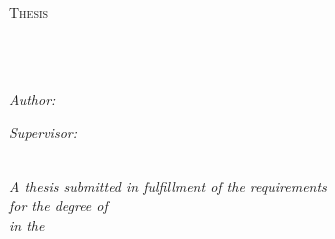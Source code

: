 \documentclass[
10pt, %
twoside, %
chapterinoneline,%
onehalfspacing, %
nolistspacing, %
parskip, %
headsepline, %
english,
]{MastersDoctoralThesis} %
\author{Author} %
\date{\today} %
\begin{document}
\frontmatter %

\pagestyle{plain} %


\begin{titlepage}
	
	\begin{center}
		
		{\scshape\LARGE \univname\par}\vspace{1.5cm} %
		\textsc{\Large Thesis}\\[0.5cm] %
		
		\HRule \\[0.4cm] %
		{\huge \bfseries \ttitle\par}\vspace{0.4cm} %
		\HRule \\[1.5cm] %
		
		\begin{minipage}[htbp]{0.4\textwidth}
			
			\begin{flushleft} \large
				\emph{Author:}\\
				\authorname %
			\end{flushleft}
			
		\end{minipage}
		
		\begin{minipage}[htbp]{0.4\textwidth}
			
			\begin{flushright}\large
				
				\emph{Supervisor:} \\
				\supname %
				 
			\end{flushright}
			
		\end{minipage}\\[3cm]
		
		\large \textit{A thesis submitted in fulfillment of the requirements\\ for the degree of \degreename}\\[0.3cm] %
		\textit{in the}\\[0.4cm]
		\groupname\\\deptname\\[2cm] %
		

\end{center}
\end{titlepage}
\end{document}
